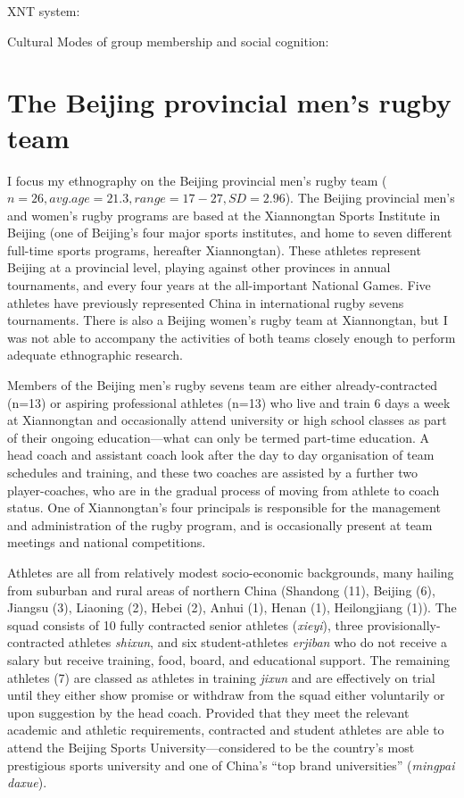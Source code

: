 XNT system:



Cultural Modes of group membership and social cognition:
















\section{The Beijing provincial men's rugby team}
I focus my ethnography on the Beijing provincial men's rugby team ($n=26, avg. age=21.3, range = 17-27, SD = 2.96$).  The Beijing provincial men's and women's rugby programs are based at the Xiannongtan Sports Institute in Beijing (one of Beijing's four major sports institutes, and home to seven different full-time sports programs, hereafter Xiannongtan).  These athletes represent Beijing at a provincial level, playing against other provinces in annual tournaments, and every four years at the all-important National Games.  Five athletes have previously represented China in international rugby sevens tournaments.  There is also a Beijing women's rugby team at Xiannongtan, but I was not able to accompany the activities of both teams closely enough to perform adequate ethnographic research.

Members of the Beijing men's rugby sevens team are either already-contracted (n=13) or aspiring professional athletes (n=13) who live and train 6 days a week at Xiannongtan and occasionally attend university or high school classes as part of their ongoing education---what can only be termed part-time education.  A head coach and assistant coach look after the day to day organisation of team schedules and training, and these two coaches are assisted by a further two player-coaches, who are in the gradual process of moving from athlete to coach status.  One of Xiannongtan's four principals is responsible for the management and administration of the rugby program, and is occasionally present at team meetings and national competitions.

Athletes are all from relatively modest socio-economic backgrounds, many hailing from suburban and rural areas of northern China (Shandong (11), Beijing (6), Jiangsu (3), Liaoning (2), Hebei (2), Anhui (1), Henan (1), Heilongjiang (1)).  The squad consists of 10 fully contracted senior athletes (\textit{xieyi}), three provisionally-contracted athletes \textit{shixun}, and six student-athletes \textit{erjiban} who do not receive a salary but receive training, food, board, and educational support.  The remaining athletes (7) are classed as athletes in training \textit{jixun} and are effectively on trial until they either show promise or withdraw from the squad either voluntarily or upon suggestion by the head coach.  Provided that they meet the relevant academic and athletic requirements, contracted and student athletes are able to attend the Beijing Sports University—considered to be the country's most prestigious sports university and one of China's ``top brand universities'' (\textit{mingpai daxue}).

